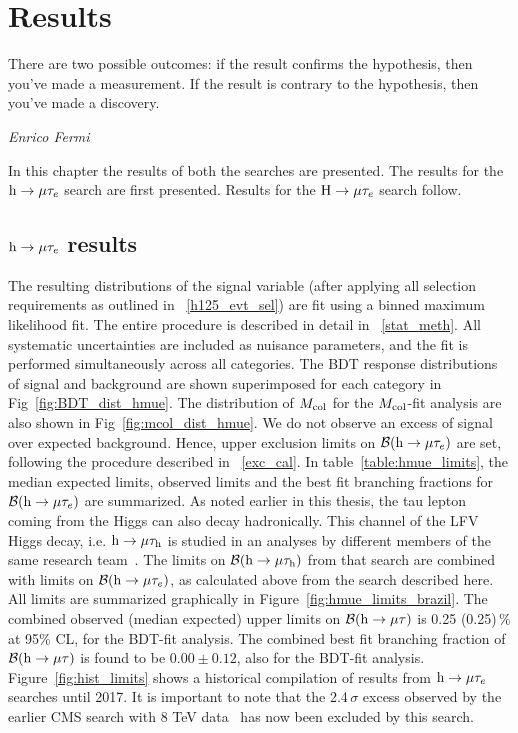 
%
%

\chapter{Results}
\epigraph{There are two possible outcomes: if the result confirms the hypothesis, then you've made a measurement. If the result is contrary to the hypothesis, then you've made a discovery.}{\textit{Enrico Fermi}}
\label{results}
\vskip 0.6in
In this chapter the results of both the searches are presented. The results for the $\text{h} \to \mu \tau_{e}$ search are first presented. Results for the $\text{H} \to \mu \tau_{e}$ search follow.

\section{$\text{h} \to \mu \tau_{e}$ results}
The resulting distributions of the signal variable (after applying all selection requirements as outlined in ~\ref{h125_evt_sel}) are fit using a binned maximum likelihood fit. The entire procedure is described in detail in ~\ref{stat_meth}. All systematic uncertainties are included as nuisance parameters, and the fit is performed simultaneously across all categories. The BDT response distributions of signal and background are shown superimposed for each category in Fig~\ref{fig:BDT_dist_hmue}. The distribution of $M_{\text{col}}$ for the $M_{\text{col}}$-fit analysis are also shown in Fig~\ref{fig:mcol_dist_hmue}. We do not observe an excess of signal over expected background. Hence, upper exclusion limits on $\mathcal{B}(\text{h} \to \mu \tau_{e})$ are set, following the procedure described in ~\ref{exc_cal}. In table~\ref{table:hmue_limits}, the median expected limits, observed limits and the best fit branching fractions for $\mathcal{B}(\text{h} \to \mu \tau_{e})$ are summarized. As noted earlier in this thesis, the tau lepton coming from the Higgs can also decay hadronically. This channel of the LFV Higgs decay, i.e. $\text{h} \to \mu \tau_{\text{h}}$ is studied in an analyses by different members of the same research team~\cite{HIG-17-001}. The limits on $\mathcal{B}(\text{h} \to \mu \tau_{\text{h}})$ from that search are combined with limits on $\mathcal{B}(\text{h} \to \mu \tau_{e})$, as calculated above from the search described here. All limits are summarized graphically in Figure~\ref{fig:hmue_limits_brazil}. The combined observed (median expected) upper limits on $\mathcal{B}(\text{h} \to \mu \tau)$ is 0.25 (0.25)\,\% at 95\% CL, for the BDT-fit analysis. The combined best fit branching fraction of $\mathcal{B}(\text{h} \to \mu \tau)$ is found to be $0.00 \pm 0.12$, also for the BDT-fit analysis. Figure~\ref{fig:hist_limits} shows a historical compilation of results from $\text{h} \to \mu \tau_{e}$ searches until 2017. It is important to note that the 2.4\,$\sigma$ excess observed by the earlier CMS search with 8 TeV data~\cite{Khachatryan:2015kon} has now been excluded by this search.


